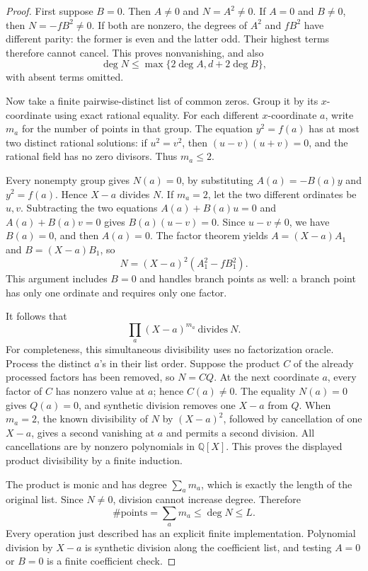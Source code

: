 \begin{proof}
First suppose $B=0$.  Then $A\ne0$ and $N=A^2\ne0$.  If $A=0$ and
$B\ne0$, then $N=-fB^2\ne0$.  If both are nonzero, the degrees of $A^2$
and $fB^2$ have different parity: the former is even and the latter odd.
Their highest terms therefore cannot cancel.  This proves nonvanishing,
and also
\[
 \deg N\le \max\{2\deg A,d+2\deg B\},
\]
with absent terms omitted.

Now take a finite pairwise-distinct list of common zeros.  Group it by
its $x$-coordinate using exact rational equality.  For each different
$x$-coordinate $a$, write $m_a$ for the number of points in that group.
The equation $y^2=f(a)$ has at most two distinct rational solutions:
if $u^2=v^2$, then $(u-v)(u+v)=0$, and the rational field has no zero
divisors.  Thus $m_a\le2$.

Every nonempty group gives $N(a)=0$, by substituting
$A(a)=-B(a)y$ and $y^2=f(a)$.  Hence $X-a$ divides $N$.
If $m_a=2$, let the two different ordinates be $u,v$.  Subtracting the
two equations $A(a)+B(a)u=0$ and $A(a)+B(a)v=0$ gives
$B(a)(u-v)=0$.  Since $u-v\ne0$, we have $B(a)=0$, and then $A(a)=0$.
The factor theorem yields $A=(X-a)A_1$ and $B=(X-a)B_1$, so
\[
          N=(X-a)^2(A_1^2-fB_1^2).
\]
This argument includes $B=0$ and handles branch points as well: a branch
point has only one ordinate and requires only one factor.

It follows that
\[
              \prod_a(X-a)^{m_a}\ \text{divides}\ N.
 \label{eq:weighted-roots}
\]
For completeness, this simultaneous divisibility uses no factorization
oracle.  Process the distinct $a$'s in their list order.  Suppose the
product $C$ of the already processed factors has been removed, so
$N=CQ$.  At the next coordinate $a$, every factor of $C$ has nonzero
value at $a$; hence $C(a)\ne0$.  The equality $N(a)=0$ gives $Q(a)=0$,
and synthetic division removes one $X-a$ from $Q$.  When $m_a=2$,
the known divisibility of $N$ by $(X-a)^2$, followed by cancellation of
one $X-a$, gives a second vanishing at $a$ and permits a second division.
All cancellations are by nonzero polynomials in $\mathbb Q[X]$.
This proves the displayed product divisibility by a finite induction.

The product is monic and has degree $\sum_a m_a$, which is exactly the
length of the original list.  Since $N\ne0$, division cannot increase
degree.  Therefore
\[
           \#\text{points}=\sum_a m_a\le\deg N\le L.
\]
Every operation just described has an explicit finite implementation.
Polynomial division by $X-a$ is synthetic division along the coefficient
list, and testing $A=0$ or $B=0$ is a finite coefficient check.
\end{proof}

